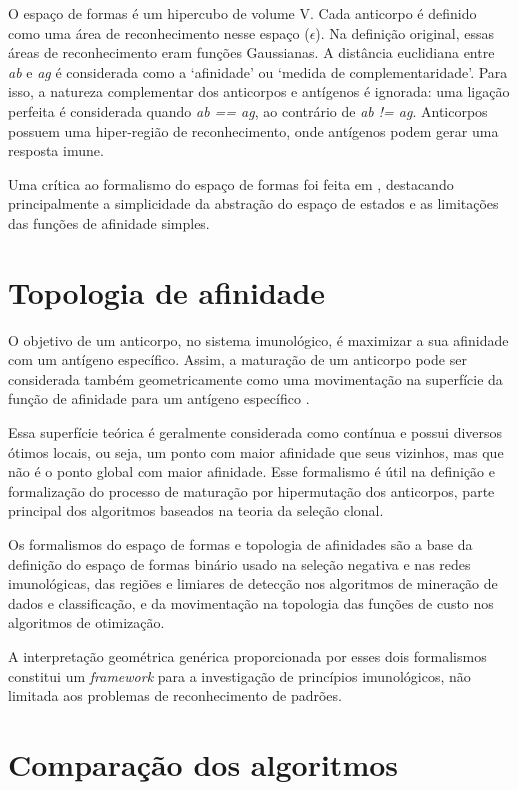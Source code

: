 O espaço de formas é um hipercubo de volume V. Cada anticorpo é definido como uma área de reconhecimento nesse espaço ($\epsilon$). Na definição original, essas áreas de reconhecimento eram funções Gaussianas. A distância euclidiana entre \emph{ab} e \emph{ag} é considerada como a `afinidade' ou `medida de complementaridade'. Para isso, a natureza complementar dos anticorpos e antígenos é ignorada: uma ligação perfeita é considerada quando \emph{ab == ag}, ao contrário de \emph{ab != ag}. Anticorpos possuem uma hiper-região de reconhecimento, onde antígenos podem gerar uma resposta imune.

Uma crítica ao formalismo do espaço de formas foi feita em \citet{Carneiro1994}, destacando principalmente a simplicidade da abstração do espaço de estados e as limitações das funções de afinidade simples.

\section{Topologia de afinidade}

O objetivo de um anticorpo, no sistema imunológico, é maximizar a sua afinidade com um antígeno específico. Assim, a maturação de um anticorpo pode ser considerada também geometricamente como uma movimentação na superfície da função de afinidade para um antígeno específico \cite{Brownlee2007}.

Essa superfície teórica é geralmente considerada como contínua e possui diversos ótimos locais, ou seja, um ponto com maior afinidade que seus vizinhos, mas que não é o ponto global com maior afinidade. Esse formalismo é útil na definição e formalização do processo de maturação por hipermutação dos anticorpos, parte principal dos algoritmos baseados na teoria da seleção clonal.

Os formalismos do espaço de formas e topologia de afinidades são a base da definição do espaço de formas binário usado na seleção negativa e nas redes imunológicas, das regiões e limiares de detecção nos algoritmos de mineração de dados e classificação, e da movimentação na topologia das funções de custo nos algoritmos de otimização.

A interpretação geométrica genérica proporcionada por esses dois formalismos constitui um \emph{framework} para a investigação de princípios imunológicos, não limitada aos problemas de reconhecimento de padrões.

\section{Comparação dos algoritmos}

